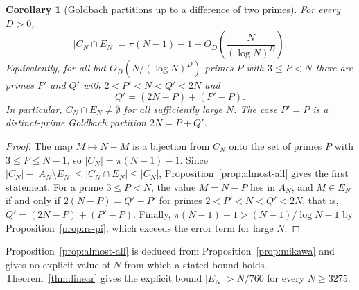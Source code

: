 \documentclass[11pt]{amsart}
\newtheorem{Corollary}[Theorem]{Corollary}
\theoremstyle{definition}
\theoremstyle{remark}
\begin{document}
\begin{Corollary}[Goldbach partitions up to a difference of two primes]\label{cor:goldbach-diff}
For every $D>0$,
\[
|C_N\cap E_N|=\pi(N-1)-1+O_D\!\left(\frac{N}{(\log N)^D}\right).
\]
Equivalently, for all but $O_D(N/(\log N)^D)$ primes $P$ with $3\leq P<N$ there are primes $P'$ and $Q'$ with $2<P'<N<Q'<2N$ and
\[
Q'=(2N-P)+(P'-P).
\]
In particular, $C_N\cap E_N\neq\emptyset$ for all sufficiently large $N$. The case $P'=P$ is a distinct-prime Goldbach partition $2N=P+Q'$.
\end{Corollary}
\begin{proof}
The map $M\mapsto N-M$ is a bijection from $C_N$ onto the set of primes $P$ with $3\leq P\leq N-1$, so $|C_N|=\pi(N-1)-1$. Since $|C_N|-|A_N\setminus E_N|\leq|C_N\cap E_N|\leq|C_N|$, Proposition~\ref{prop:almost-all} gives the first statement. For a prime $3\leq P<N$, the value $M=N-P$ lies in $A_N$, and $M\in E_N$ if and only if $2(N-P)=Q'-P'$ for primes $2<P'<N<Q'<2N$, that is, $Q'=(2N-P)+(P'-P)$. Finally, $\pi(N-1)-1>(N-1)/\log N-1$ by Proposition~\ref{prop:rs-pi}, which exceeds the error term for large $N$.
\end{proof}
Proposition~\ref{prop:almost-all} is deduced from Proposition~\ref{prop:mikawa} and gives no explicit value of $N$ from which a stated bound holds. Theorem~\ref{thm:linear} gives the explicit bound $|E_N|>N/760$ for every $N\geq 3275$.
\end{document}

